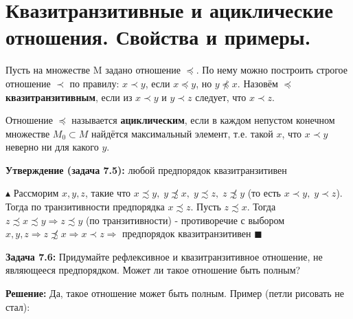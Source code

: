 \setcounter{section}{24}

\section{Квазитранзитивные и ациклические отношения. Свойства и примеры.}
\par Пусть на множестве M задано отношение $\preccurlyeq$. По нему можно построить строгое отношение $\prec$ по правилу: $x \prec y$, если $x \preccurlyeq y$, но $y \not\preccurlyeq x$. Назовём $\preccurlyeq$ \textbf{квазитранзитивным}, если из $x \prec y$ и $y \prec z$ следует, что $x \prec z$.
\par Отношение $\preccurlyeq$ называется \textbf{ациклическим}, если в каждом непустом конечном множестве $M_0 \subset M$ найдётся максимальный элемент, т.е. такой $x$, что $x \prec y$ неверно ни для какого $y$.

\par \textbf{Утверждение (задача 7.5):} любой предпорядок квазитранзитивен
\par $\blacktriangle$ Рассморим $x, y, z$, такие что $x \precsim y, \; y \not\precsim x, \; y \precsim z, \; z \not\precsim y$ (то есть $x \prec y, \; y \prec z$). Тогда по транзитивности предпорядка $x \precsim z$. Пусть $z \precsim x$. Тогда $z \precsim x \precsim y \Rightarrow z \precsim y$ (по транзитивности) - противоречие с выбором $x, y, z \Rightarrow z \not\precsim x \Rightarrow x \prec z \Rightarrow$ предпорядок квазитранзитивен $\blacksquare$

\par \textbf{Задача 7.6:} Придумайте рефлексивное и квазитранзитивное отношение, не являющееся предпорядком. Может ли такое отношение быть полным?
\par \textbf{Решение:} Да, такое отношение может быть полным. Пример (петли рисовать не стал):

\begin{figure}[h]
\end{figure}

